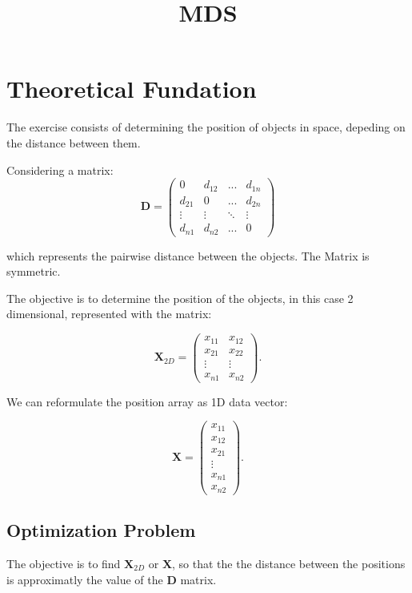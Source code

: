 \documentclass[a4paper,12pt]{article}
\title{MDS}
\begin{document}
\section{Theoretical Fundation}
The exercise consists of determining the position of objects in space,
depeding on the distance between them.

Considering a matrix:
\begin{equation}
\bm{D} = 
\begin{pmatrix}
0 & d_{12} & ... & d_{1n} \\
d_{21} & 0 & ... & d_{2n} \\
\vdots & \vdots & \ddots & \vdots \\
d_{n1} & d_{n2} & ... & 0    
\end{pmatrix}
\end{equation}

which represents the pairwise distance between the objects. The Matrix is 
symmetric.

The objective is to determine the position of the objects, in this case 2 dimensional, represented
with the matrix:

\begin{equation}
\bm{X}_{2D} = 
\begin{pmatrix}
x_{11} & x_{12} \\
x_{21} & x_{22} \\
\vdots & \vdots \\
x_{n1} & x_{n2}
\end{pmatrix}.
\end{equation}

We can reformulate the position array as 1D data vector:

\begin{equation}
\bm{X} = 
\begin{pmatrix}
x_{11} \\ x_{12} \\
x_{21} \\
\vdots \\
x_{n1} \\ x_{n2}
\end{pmatrix}.
\end{equation}

\subsection{Optimization Problem}
The objective is to find $\bm{X}_{2D}$ or $\bm{X}$, so that the the distance between the positions
is approximatly the value of the $\bm{D}$ matrix.
\end{document}
